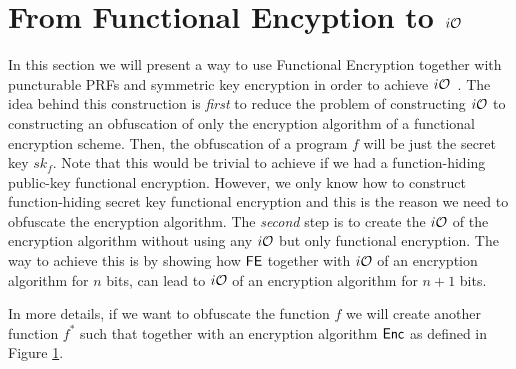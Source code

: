 \section{From Functional Encyption to $i\mathcal{O}$}

In this section we will present a way to use Functional Encryption together with puncturable PRFs and symmetric key encryption in order to achieve $i\mathcal{O}$~\cite{iO-FE}. The idea behind this construction is \emph{first} to reduce the problem of constructing $i\mathcal{O}$ to constructing an obfuscation of only the encryption algorithm of a functional encryption scheme. Then, the obfuscation of a program $f$ will be just the secret key $sk_f$. Note that this would be trivial to achieve if we had a function-hiding public-key functional encryption. However, we only know how to construct function-hiding secret key functional encryption and this is the reason we need to obfuscate the encryption algorithm. The \emph{second} step is to create the $i\mathcal{O}$ of the encryption algorithm without using any $i\mathcal{O}$ but only functional encryption. The way to achieve this is by showing how $\mathsf{FE}$ together with $i\mathcal{O}$ of an encryption algorithm for $n$ bits, can lead to $i\mathcal{O}$ of an encryption algorithm for $n+1$ bits.

In more details, if we want to obfuscate the function $f$ we will create another function $f^*$ such that together with an encryption algorithm $\mathsf{Enc}$ as defined in Figure \ref{fig:enc}.
\begin{figure}[!h]
	
\centering
{}
\hfill
\centering
{}
\caption{}
\label{fig:enc}
\end{figure}

